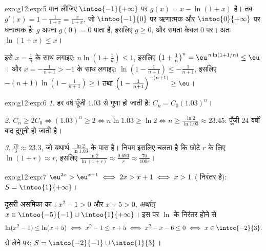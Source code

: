 \begin{solution}{exo:g12:exp:5}
मान लीजिए $\intoo{-1}{+\infty}$ पर $g(x) = x - \ln(1+x)$ है। तब $g'(x) = 1 - \frac{1}{1+x} = \frac{x}{1+x}$, जो $\intoo{-1}{0}$ पर ऋणात्मक और $\intoo{0}{+\infty}$ पर धनात्मक है:
$g$ अपना  $g(0) = 0$ पाता है, इसलिए $g \geq 0$, और समता केवल $0$ पर। अतः $\ln(1+x) \leq x$।

इसे $x = \frac1n$ के साथ लगाइए: $n\ln\left(1 + \frac1n\right) \leq 1$, इसलिए $\left(1+\frac1n\right)^n = \eu^{\,n\ln(1+1/n)} \leq \eu$। और $x = -\frac{1}{n+1} > -1$ के साथ लगाइए: $\ln\left(1 - \frac{1}{n+1}\right) \leq -\frac{1}{n+1}$, इसलिए
$-(n+1)\ln\left(1 - \frac{1}{n+1}\right) \geq 1$ तथा $\left(1 - \frac{1}{n+1}\right)^{-(n+1)} \geq \eu$।
\end{solution}

\begin{solution}{exo:g12:exp:6}
\emph{1.} हर वर्ष पूँजी $1.03$ से गुणा हो जाती है: $C_n = C_0 (1.03)^n$।

\emph{2.} $C_n \geq 2C_0 \iff (1.03)^n \geq 2 \iff n \ln 1.03 \geq \ln 2
\iff n \geq \frac{\ln 2}{\ln 1.03} \approx 23.45$: पूँजी $24$ वर्षों बाद दुगुनी हो जाती है।

\emph{3.} $\frac{70}{3} \approx 23.3$, जो यथार्थ $\frac{\ln 2}{\ln 1.03}$ के पास है। नियम इसलिए चलता है कि छोटे $r$ के
लिए $\ln(1 + r) \approx r$, इसलिए $\frac{\ln 2}{\ln(1+r)} \approx \frac{0.693}{r} \approx \frac{70}{100r}$।
\end{solution}

\begin{solution}{exo:g12:exp:7}
$\eu^{2x} > \eu^{x+1} \iff 2x > x + 1 \iff x > 1$ ( निरंतर  है): $S = \intoo{1}{+\infty}$।

दूसरी असमिका का : $x^2 - 1 > 0$ और $x + 5 > 0$, \emph{अर्थात्} $x \in \intoo{-5}{-1} \cup \intoo{1}{+\infty}$। इस  पर $\ln$
के निरंतर  होने से
\[
\ln(x^2-1) \leq \ln(x+5) \iff x^2 - 1 \leq x + 5 \iff x^2 - x - 6 \leq 0
\iff x \in \intcc{-2}{3}.
\]
 से  लेने पर: $S = \intco{-2}{-1} \cup \intoc{1}{3}$।
\end{solution}

